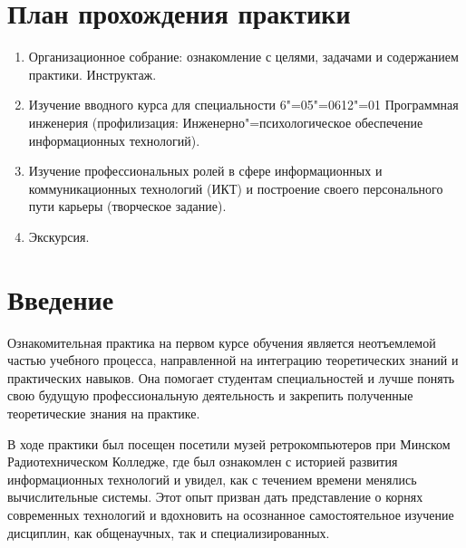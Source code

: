\documentclass[variant=practice]{bsuir}
\begin{document}
\maketitle

\chapter*{План прохождения практики}

\begin{enumerate}
      \item Организационное собрание: ознакомление с целями, задачами и
            содержанием практики. Инструктаж.
      \item Изучение вводного курса  для
            специальности 6"=05"=0612"=01 Программная инженерия (профилизация:
            Инженерно"=психологическое обеспечение информационных технологий).
      \item Изучение профессиональных ролей в сфере информационных и
            коммуникационных технологий (ИКТ) и построение своего персонального
            пути карьеры (творческое задание).
      \item Экскурсия.
\end{enumerate}

\tableofcontents

\chapter*{Введение}


Ознакомительная практика на первом курсе обучения является неотъемлемой частью
учебного процесса, направленной на интеграцию теоретических знаний и
практических навыков. Она помогает студентам специальностей
 и  лучше понять свою будущую профессиональную деятельность и закрепить
полученные теоретические знания на практике.

В ходе практики был посещен посетили музей ретрокомпьютеров
\textit{} при Минском Радиотехническом Колледже, где был
ознакомлен с историей развития информационных технологий и увидел, как с
течением времени менялись вычислительные системы. Этот опыт призван дать
представление о корнях современных технологий и вдохновить на осознанное
самостоятельное изучение дисциплин, как общенаучных, так и специализированных.
\end{document}
